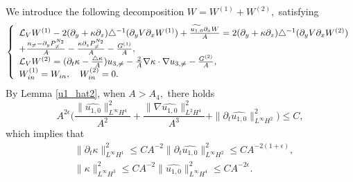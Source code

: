 \documentclass[12pt, reqno]{amsart}
\numberwithin{equation}{section}
\begin{document}
	We introduce the following decomposition $W=W^{(1)}+W^{(2)},$
	satisfying 
	\begin{equation}\label{w_equ1}
		\left\{
		\begin{array}{lr}
			\mathcal{L}_VW^{(1)}
			-2(\partial_y+\kappa\partial_z)
			\triangle^{-1}(\partial_yV\partial_xW^{(1)})
			+\frac{\widetilde{u_{1,0}}\partial_x W}{A}
			=2(\partial_y+\kappa\partial_z)\triangle^{-1}
			(\partial_yV\partial_xW^{(2)})
			\\
			+\frac{n_{\neq}-\partial_yP^{N_2}_{\neq}}{A}-\frac{\kappa\partial_zP^{N_2}_{\neq}}{A}-\frac{G^{(1)}}{A},\\
			\mathcal{L}_VW^{(2)}
			=(\partial_t\kappa-\frac{\triangle\kappa}{A})u_{3,\neq}
			-\frac{2}{A}\nabla\kappa\cdot\nabla u_{3,\neq}-\frac{G^{(2)}}{A},\\
			W^{(1)}_{\rm in}=W_{\rm in},~~~ W^{(2)}_{\rm in}=0.
		\end{array}
		\right.
	\end{equation}	
	By Lemma \ref{u1_hat2}, when $A>A_4,$ there holds
	$$A^{2\epsilon}
	\Big(\frac{\|\widehat{u_{1,0}}\|^2_{L^{\infty}H^4}}{A^{2}}
	+\frac{\|\nabla\widehat{u_{1,0}}\|^2_{L^{2}H^4}}{A^{3}}
	+\|\partial_t\widehat{u_{1,0}}\|^2_{L^{\infty}H^2}\Big)
	\leq C,$$
	which implies that 
	\begin{equation}\label{kappa_estimate}
		\begin{aligned}
			&\|\partial_t\kappa\|^2_{L^{\infty}H^1}\leq CA^{-2}\|\partial_t\widehat{u_{1,0}}\|^2_{L^{\infty}H^2}
			\leq CA^{-2(1+\epsilon)},\\
			&\|\kappa\|^2_{L^{\infty}H^3}\leq CA^{-2}
			\|\widehat{u_{1,0}}\|^2_{L^{\infty}H^4}\leq CA^{-2\epsilon}.
		\end{aligned}
	\end{equation}
	
\end{document}

